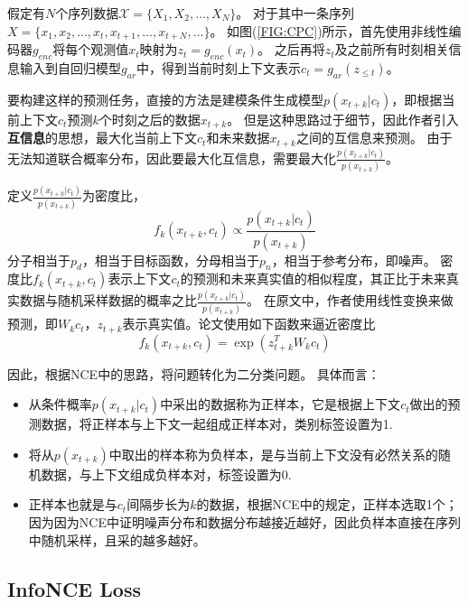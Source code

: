 \documentclass{article}
\begin{document}
假定有$N$个序列数据$\mathcal{X} = \{X_1, X_2, \ldots, X_N\}$。
对于其中一条序列$X = \{x_1, x_2,\ldots, x_t, x_{t+1}, \ldots, x_{t+N},\ldots\}$。
如图(\ref{FIG:CPC})所示，首先使用非线性编码器$g_{enc}$将每个观测值$x_t$映射为$z_t=g_{enc}(x_t)$。
之后再将$z_t$及之前所有时刻相关信息输入到自回归模型$g_{ar}$中，得到当前时刻上下文表示$c_t = g_{ar}(z_{\le t})$。

要构建这样的预测任务，直接的方法是建模条件生成模型$p(x_{t+k}|c_t)$，即根据当前上下文$c_t$预测$k$个时刻之后的数据$x_{t+k}$。
但是这种思路过于细节，因此作者引入\textbf{互信息}的思想，最大化当前上下文$c_t$和未来数据$x_{t+k}$之间的互信息来预测。
由于无法知道联合概率分布，因此要最大化互信息，需要最大化$\frac{p(x_{t+k}|c_{t})}{p(x_{t+k})}$。

定义$\frac{p(x_{t+k}|c_{t})}{p(x_{t+k})}$为密度比，
\begin{equation}
    f_k(x_{t+k},c_t) \propto \frac{p(x_{t+k}|c_{t})}{p(x_{t+k})}
\end{equation}
分子相当于$p_d$，相当于目标函数，分母相当于$p_n$，相当于参考分布，即噪声。
密度比$f_k(x_{t+k}, c_t)$表示上下文$c_t$的预测和未来真实值的相似程度，其正比于未来真实数据与随机采样数据的概率之比$\frac{p(x_{t+k}|c_{t})}{p(x_{t+k})}$。
在原文中，作者使用线性变换来做预测，即$W_k c_t$，$z_{t+k}$表示真实值。论文使用如下函数来逼近密度比
\begin{equation}
    f_k(x_{t+k}, c_t) = \exp(z_{t+k}^T W_k c_t)
\end{equation}

因此，根据NCE中的思路，将问题转化为二分类问题。
具体而言：
\begin{itemize}
    \item 从条件概率$p(x_{t+k}|c_t)$中采出的数据称为正样本，它是根据上下文$c_t$做出的预测数据，将正样本与上下文一起组成正样本对，类别标签设置为1.
    \item 将从$p(x_{t+k})$中取出的样本称为负样本，是与当前上下文没有必然关系的随机数据，与上下文组成负样本对，标签设置为0.
    \item 正样本也就是与$c_t$间隔步长为$k$的数据，根据NCE中的规定，正样本选取1个；因为因为NCE中证明噪声分布和数据分布越接近越好，因此负样本直接在序列中随机采样，且采的越多越好。
\end{itemize}


\subsection{InfoNCE Loss}
\end{document}
